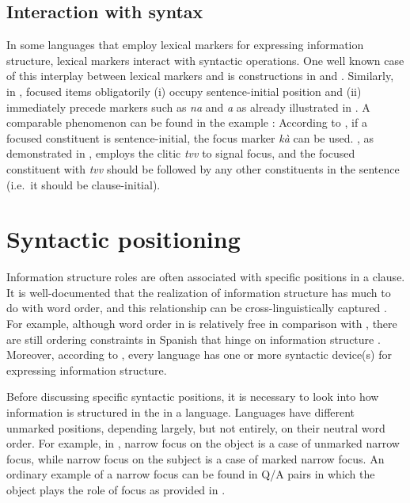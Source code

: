 \subsection{Interaction with syntax}
\label{4:ssec:interaction-syn}



In some languages that employ lexical markers for expressing
information structure, lexical markers interact
with syntactic operations.  One well known case of this interplay
between lexical markers and  is
 constructions in  and 
\citep{choi:99,ishihara:01}. Similarly, in , focused items
obligatorily (i) occupy sentence-initial position and (ii) immediately
precede  markers such as \textit{na} and \textit{a} as already
illustrated in  \citep[4]{drubig:03}.  A comparable
phenomenon can be found in the  example :
According to \citet{fery:krifka:08}, if a focused constituent is
sentence-initial, the focus marker \textit{k\`{a}} can be
used. , as demonstrated in , employs the
clitic \textit{tvv} to signal focus, and the focused constituent with
\textit{tvv} should be followed by any other constituents in the
sentence (i.e.\ it should be clause-initial).



\section{Syntactic positioning}
\label{4:sec:syntactic}



Information structure roles are often associated with specific
positions in a clause. It is well-documented that the realization of
information structure has much to do with word order, and this
relationship can be cross-linguistically 
captured \citep{zubizarreta:98,van:05,mereu:09}.  For example, although word
order in  is relatively free in comparison with
, there are still ordering constraints in Spanish that
hinge on information structure \citep{zagona:02}.  Moreover, according 
to \citet{li:thompson:76}, every language has one or more syntactic
device(s) for expressing information structure.



Before discussing specific syntactic positions, it is necessary to
look into how information is structured in the 
in a language. Languages have different
unmarked  positions, depending largely, but not entirely, on
their neutral word order. For example, in , narrow focus on the
object is a case of unmarked narrow focus, while narrow focus on the
subject is a case of marked narrow focus.  An ordinary example of a
narrow focus can be found in Q/A pairs in which the object plays the
role of focus as provided in .


